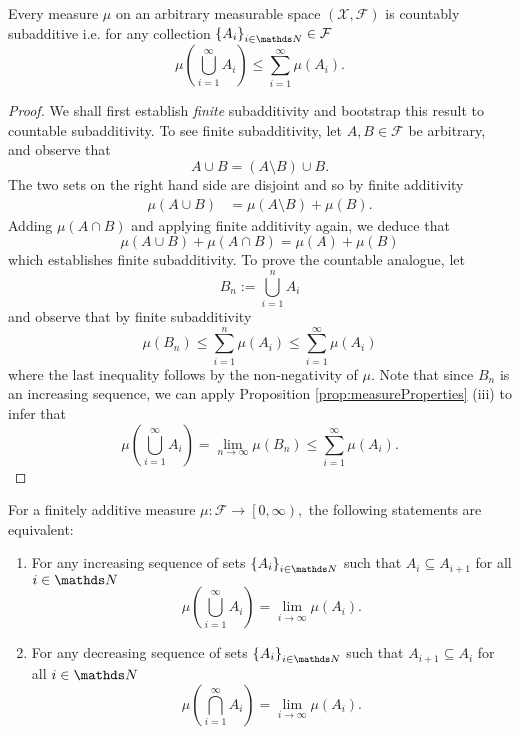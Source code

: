 \begin{cor}
\label{cor:countableSubadditivity}Every measure $\mu$ on an arbitrary
measurable space $\left(\mathcal{X},\mathcal{F}\right)$ is countably
subadditive i.e. for any collection $\left\{ A_{i}\right\} _{i\in\N}\in\mathcal{F}$
\[
\mu\left(\bigcup_{i=1}^{\infty}A_{i}\right)\leq\sum_{i=1}^{\infty}\mu\left(A_{i}\right).
\]
\end{cor}

\begin{proof}
We shall first establish \emph{finite }subadditivity and bootstrap
this result to countable subadditivity. To see finite subadditivity,
let $A,B\in\mathcal{F}$ be arbitrary, and observe that
\[
A\cup B=\left(A\setminus B\right)\cup B.
\]
The two sets on the right hand side are disjoint and so by finite
additivity
\begin{align*}
\mu\left(A\cup B\right) & =\mu\left(A\setminus B\right)+\mu\left(B\right).
\end{align*}
Adding $\mu\left(A\cap B\right)$ and applying finite additivity again,
we deduce that
\[
\mu\left(A\cup B\right)+\mu\left(A\cap B\right)=\mu\left(A\right)+\mu\left(B\right)
\]
which establishes finite subadditivity. To prove the countable analogue,
let
\[
B_{n}:=\bigcup_{i=1}^{n}A_{i}
\]
and observe that by finite subadditivity
\[
\mu\left(B_{n}\right)\leq\sum_{i=1}^{n}\mu\left(A_{i}\right)\leq\sum_{i=1}^{\infty}\mu\left(A_{i}\right)
\]
where the last inequality follows by the non-negativity of $\mu.$
Note that since $B_{n}$ is an increasing sequence, we can apply Proposition
\ref{prop:measureProperties} (iii) to infer that
\[
\mu\left(\bigcup_{i=1}^{\infty}A_{i}\right)=\lim_{n\to\infty}\mu\left(B_{n}\right)\leq\sum_{i=1}^{\infty}\mu\left(A_{i}\right).
\]
\end{proof}
\begin{prop}
\label{prop:equivalenceContinuityMeasures}For a finitely additive
measure $\mu:\mathcal{F}\longrightarrow\left[0,\infty\right),$ the
following statements are equivalent:

\begin{enumerate}[label=(\roman*),leftmargin=.1\linewidth,rightmargin=.4\linewidth]
	\item For any increasing sequence of sets $\left\{ A_{i}\right\} _{i\in\N}$ such that $A_i \subseteq A_{i+1}$ for all $i\in \N$ 
	\[
					\mu\left(\bigcup_{i=1}^{\infty} A_i\right) = \lim_{i\to\infty}\mu\left(A_i\right).
	\]
	\item For any decreasing sequence of sets $\left\{ A_{i}\right\} _{i\in\N}$ such that $ A_{i+1}\subseteq A_i$ for all $i\in \N$ 
	\[
					\mu\left(\bigcap_{i=1}^{\infty} A_i\right) = \lim_{i\to\infty}\mu\left(A_i\right).
	\]
\end{enumerate}
\end{prop}

